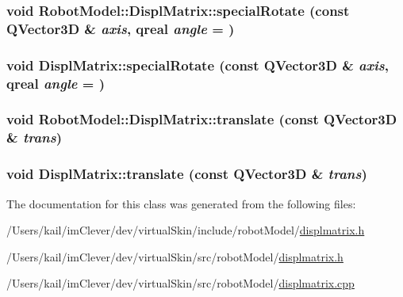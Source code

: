 \label{class_robot_model_1_1_displ_matrix_a9ea9b65326be614baea1ea86a2a1b258}
\hypertarget{class_robot_model_1_1_displ_matrix_aca7b61e995cbfc98b4c9be8005877de5}{
\subsubsection[{specialRotate}]{\setlength{\rightskip}{0pt plus 5cm}void RobotModel::DisplMatrix::specialRotate (const QVector3D \& {\em axis}, \/  qreal {\em angle} = {})}}
\label{class_robot_model_1_1_displ_matrix_aca7b61e995cbfc98b4c9be8005877de5}
\hypertarget{class_robot_model_1_1_displ_matrix_ac77a7ddd42d4a58251823c1fe06d65a2}{
\subsubsection[{specialRotate}]{\setlength{\rightskip}{0pt plus 5cm}void DisplMatrix::specialRotate (const QVector3D \& {\em axis}, \/  qreal {\em angle} = {})}}
\label{class_robot_model_1_1_displ_matrix_ac77a7ddd42d4a58251823c1fe06d65a2}
\hypertarget{class_robot_model_1_1_displ_matrix_a0c318584b444a3da704d0b4134e10836}{
\subsubsection[{translate}]{\setlength{\rightskip}{0pt plus 5cm}void RobotModel::DisplMatrix::translate (const QVector3D \& {\em trans})}}
\label{class_robot_model_1_1_displ_matrix_a0c318584b444a3da704d0b4134e10836}
\hypertarget{class_robot_model_1_1_displ_matrix_ae9aa3671b52f8300ac2f11648fa1fddf}{
\subsubsection[{translate}]{\setlength{\rightskip}{0pt plus 5cm}void DisplMatrix::translate (const QVector3D \& {\em trans})}}
\label{class_robot_model_1_1_displ_matrix_ae9aa3671b52f8300ac2f11648fa1fddf}


The documentation for this class was generated from the following files:\begin{DoxyCompactItemize}
\item 
/Users/kail/imClever/dev/virtualSkin/include/robotModel/\hyperlink{include_2robot_model_2displmatrix_8h}{displmatrix.h}\item 
/Users/kail/imClever/dev/virtualSkin/src/robotModel/\hyperlink{src_2robot_model_2displmatrix_8h}{displmatrix.h}\item 
/Users/kail/imClever/dev/virtualSkin/src/robotModel/\hyperlink{displmatrix_8cpp}{displmatrix.cpp}\end{DoxyCompactItemize}
